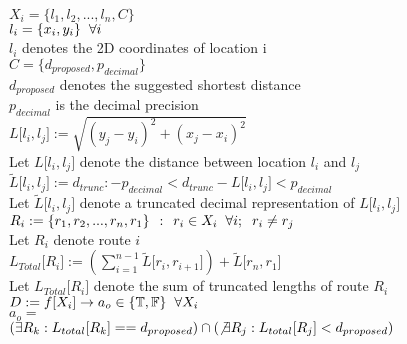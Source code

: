 \documentclass[11pt]{article}
\begin{document}
\begin{center}
$
X_i = \{l_1,l_2,...,l_n,C\}
$
\\ \vspace{5mm}
$
l_i = \{x_i,y_i\} \hspace{2mm} \forall i
$
\\ \vspace{2mm}
$l_i$ denotes the 2D coordinates of location i
\\ \vspace{5mm}
$
C = \{d_{proposed},p_{decimal}\}
$
\\ \vspace{2mm}
$
d_{proposed}$ denotes the suggested shortest distance
\\ \vspace{1.5mm}
$
p_{decimal}$ is the decimal precision
\\ \vspace{5mm}
$
L\lbrack l_i,l_j \rbrack := \sqrt{(y_j - y_i)^2 + (x_j - x_i)^2}
$
\\ \vspace{2mm}
Let $L\lbrack l_i,l_j \rbrack$ denote the distance between location $l_i$ and $l_j$
\\ \vspace{5mm}
$
\tilde{L} \lbrack l_i,l_j \rbrack :=d_{trunc} : -p_{decimal} < d_{trunc} - L\lbrack l_i,l_j \rbrack < p_{decimal}
$
\\ \vspace{2mm}
Let $\tilde{L}\lbrack l_i,l_j \rbrack$ denote a truncated decimal representation of $L\lbrack l_i,l_j \rbrack$
\\ \vspace{5mm}
$
R_i := \{r_1,r_2,...,r_n,r_1\} \hspace{1.5mm} : \hspace{1.5mm} r_i \in X_i \hspace{2mm} \forall i; \hspace{2mm} r_i \neq r_j
$
\\ \vspace{2mm}
Let $R_i$ denote route $i$
\\ \vspace{5mm}
$
L_{Total}\lbrack R_i \rbrack := (\sum_{i=1}^{n-1} \tilde{L}\lbrack r_i,r_{i+1}\rbrack) + \tilde{L}\lbrack r_n,r_1\rbrack
$
\\ \vspace{2mm}
Let $L_{Total}\lbrack R_i \rbrack$ denote the sum of truncated lengths of route $R_i$
\\ \vspace{5mm}
$
D := f \lbrack X_i \rbrack \rightarrow a_o \in \{\mathbb{T},\mathbb{F}\} \hspace{2mm} \forall X_i
$
\\ \vspace{2mm}
$
a_o =
$
\\ \vspace{2mm}
$
(\exists R_k : L_{total}\lbrack R_k\rbrack == d_{proposed}) \cap (\not \exists R_j :  L_{total}\lbrack R_j \rbrack < d_{proposed})
$
\end{center}
\end{document}
